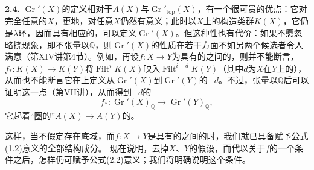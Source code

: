\textbf{2.4.} $\operatorname{Gr}'(X)$的定义相对于$A(X)$与$\operatorname{Gr}'_{\mathrm{top}}(X)$，有一个很可贵的优点：它对完全任意的$X$，更地，对任意$X$仍然有意义；此时以$X$上的构造类群$K(X)$，它仍是$\lambda$环，因而具有相应的，可以定义$\operatorname{Gr}'(X)$。但这种性也有代价：如果不愿忽略挠现象，即不张量以$\mathbb Q$，则$\operatorname{Gr}'(X)$的性质在若干方面不如另两个候选者令人满意（第XIV讲第4节）。例如，再设$f:X\longrightarrow Y$为具有的之间的，则并不能断言，$f_*:K(X)\longrightarrow K(Y)$将$\operatorname{Filt}^iK(X)$映入$\operatorname{Filt}^{i-d}K(Y)$（其中$d$为$X$在$Y$上的），从而也不能断言它在上定义从$\operatorname{Gr}'(X)$到$\operatorname{Gr}'(Y)$的$-d$。不过，张量以$\mathbb Q$后可以证明这一点（第VII讲），从而得到$-d$的
\[f_*:\operatorname{Gr}'(X)_{\mathbb Q}\longrightarrow\operatorname{Gr}'(Y)_{\mathbb Q},\tag{2.5}\]
它起着“圈的”$A(X)\longrightarrow A(Y)$的。

这样，当不假定存在底域，而$f:X\longrightarrow Y$是具有的之间的时，我们就已具备赋予公式(1.2)意义的全部结构成分。
现在说明，去掉$X$、$Y$的假设，而代以关于$f$的一个条件之后，怎样仍可赋予公式(2.2)意义；我们将明确说明这个条件。

